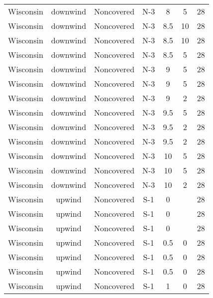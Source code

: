 \documentclass{article}
\begin{document}
\begin{longtable}[c]{ccccccc}
Wisconsin & downwind  & Noncovered & N-3             & 8            & 5           & 28  \\
Wisconsin & downwind  & Noncovered & N-3             & 8.5          & 10          & 28  \\
Wisconsin & downwind  & Noncovered & N-3             & 8.5          & 10          & 28  \\
Wisconsin & downwind  & Noncovered & N-3             & 8.5          & 5           & 28  \\
Wisconsin & downwind  & Noncovered & N-3             & 9            & 5           & 28  \\
Wisconsin & downwind  & Noncovered & N-3             & 9            & 5           & 28  \\
Wisconsin & downwind  & Noncovered & N-3             & 9            & 2           & 28  \\
Wisconsin & downwind  & Noncovered & N-3             & 9.5          & 5           & 28  \\
Wisconsin & downwind  & Noncovered & N-3             & 9.5          & 2           & 28  \\
Wisconsin & downwind  & Noncovered & N-3             & 9.5          & 2           & 28  \\
Wisconsin & downwind  & Noncovered & N-3             & 10           & 5           & 28  \\
Wisconsin & downwind  & Noncovered & N-3             & 10           & 5           & 28  \\
Wisconsin & downwind  & Noncovered & N-3             & 10           & 2           & 28  \\
Wisconsin & upwind    & Noncovered & S-1             & 0            &             & 28  \\
Wisconsin & upwind    & Noncovered & S-1             & 0            &             & 28  \\
Wisconsin & upwind    & Noncovered & S-1             & 0            &             & 28  \\
Wisconsin & upwind    & Noncovered & S-1             & 0.5          & 0           & 28  \\
Wisconsin & upwind    & Noncovered & S-1             & 0.5          & 0           & 28  \\
Wisconsin & upwind    & Noncovered & S-1             & 0.5          & 0           & 28  \\
Wisconsin & upwind    & Noncovered & S-1             & 1            & 0           & 28  \\

\end{longtable}
\end{document}
